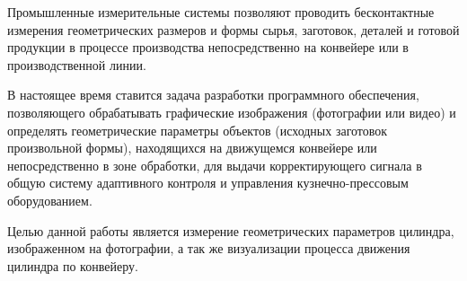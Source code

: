 \Introduction

Промышленные измерительные системы позволяют проводить бесконтактные измерения геометрических размеров и формы сырья, заготовок, деталей и готовой продукции в процессе производства непосредственно на конвейере или в производственной линии.

В настоящее время ставится задача разработки программного обеспечения, позволяющего обрабатывать графические изображения (фотографии или видео) и определять геометрические параметры объектов (исходных заготовок произвольной формы), находящихся на движущемся конвейере или непосредственно в зоне обработки, для выдачи корректирующего сигнала в общую систему адаптивного контроля и управления кузнечно-прессовым оборудованием.

Целью данной работы является измерение геометрических параметров цилиндра, изображенном на фотографии, а так же визуализации процесса движения цилиндра по конвейеру.